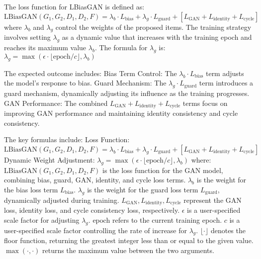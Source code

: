 The loss function for LBiasGAN is defined as:
$ \text{LBiasGAN}(G_1, G_2, D_1, D_2, F) = \lambda_b \cdot L_{\text{bias}} + \lambda_g \cdot L_{\text{guard}} + [L_{\text{GAN}} + L_{\text{identity}} + L_{\text{cycle}}] $
where $ \lambda_b $ and $ \lambda_g $ control the weights of the proposed items.
The training strategy involves setting $ \lambda_g $ as a dynamic value that increases with the training epoch and reaches its maximum value $ \lambda_b $. The formula for $ \lambda_g $ is:
$ \lambda_g = \max(\epsilon \cdot \lfloor \text{epoch} / c \rfloor, \lambda_b) $

The expected outcome includes:
Bias Term Control: The $ \lambda_b \cdot L_{\text{bias}} $ term adjusts the model's response to bias.
Guard Mechanism: The $ \lambda_g \cdot L_{\text{guard}} $ term introduces a guard mechanism, dynamically adjusting its influence as the training progresses.
GAN Performance: The combined $ L_{\text{GAN}} + L_{\text{identity}} + L_{\text{cycle}} $ terms focus on improving GAN performance and maintaining identity consistency and cycle consistency.

The key formulas include:
Loss Function:
$ \text{LBiasGAN}(G_1, G_2, D_1, D_2, F) = \lambda_b \cdot L_{\text{bias}} + \lambda_g \cdot L_{\text{guard}} + [L_{\text{GAN}} + L_{\text{identity}} + L_{\text{cycle}}] $
Dynamic Weight Adjustment:
$ \lambda_g = \max(\epsilon \cdot \lfloor \text{epoch} / c \rfloor, \lambda_b) $
where:
$ \text{LBiasGAN}(G_1, G_2, D_1, D_2, F) $ is the loss function for the GAN model, combining bias, guard, GAN, identity, and cycle loss terms.
$ \lambda_b $ is the weight for the bias loss term $ L_{\text{bias}} $.
$ \lambda_g $ is the weight for the guard loss term $ L_{\text{guard}} $, dynamically adjusted during training.
$ L_{\text{GAN}}, L_{\text{identity}}, L_{\text{cycle}} $ represent the GAN loss, identity loss, and cycle consistency loss, respectively.
$ \epsilon $ is a user-specified scale factor for adjusting $ \lambda_g $.
$ \text{epoch} $ refers to the current training epoch.
$ c $ is a user-specified scale factor controlling the rate of increase for $ \lambda_g $.
$ \lfloor \cdot \rfloor $ denotes the floor function, returning the greatest integer less than or equal to the given value.
$ \max(\cdot, \cdot) $ returns the maximum value between the two arguments.

